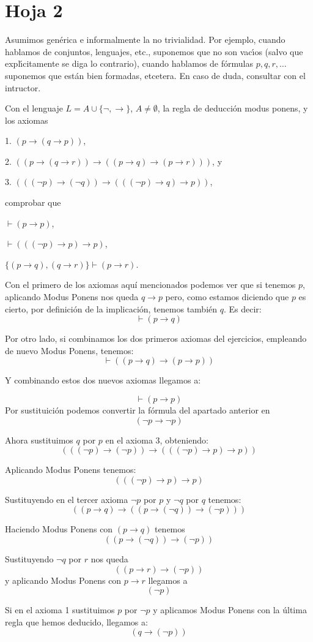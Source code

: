 \section{Hoja 2}

Asumimos gen\'erica e informalmente la no trivialidad. Por ejemplo,
cuando hablamos de conjuntos, lenguajes, etc., suponemos que no  son vac\'{\i}os (salvo que
expl\'{\i}citamente
se diga lo contrario),  cuando hablamos de f\'ormulas $p, q, r, \dots$
suponemos que est\'an bien formadas, etcetera.
En caso de duda, consultar con el intructor.

\begin{problem}[1]
Con el lenguaje $L = A \cup \{\neg, \to\}$, $A \ne \emptyset$, la regla de deducci\'on modus ponens,
y los axiomas

1.  $ (p\to (q\to p))$,

2. $( (p\to (q\to r)) \to  ( (p\to q) \to (p\to r)))$, y

3. $(( (\neg p) \to (\neg q)) \to  ( ((\neg p) \to q) \to p))$,

comprobar que

\ppart $\vdash (p\to p)$,

\ppart $\vdash ((( \neg p) \to p)\to p)$,

\ppart  $\{(p\to q), (q\to r)\} \vdash (p\to r)$.
\solution

\spart
Con el primero de los axiomas aquí mencionados podemos ver que si tenemos $p$, aplicando Modus Ponens nos queda $q \to p$ pero, como estamos diciendo que $p$ es cierto, por definición de la implicación, tenemos también $q$. Es decir:
\[\vdash (p \to q)\]

Por otro lado, si combinamos los dos primeros axiomas del ejercicios, empleando de nuevo Modus Ponens, tenemos:
\[\vdash ( (p\to q) \to (p\to p))\]

Y combinando estos dos nuevos axiomas llegamos a:

\[\vdash (p \to p)\]
\spart
Por sustituición podemos convertir la fórmula del apartado anterior en
\[ (\neg p \to \neg p)\]

Ahora sustituimos $q$ por $p$ en el axioma 3, obteniendo:
\[ (( (\neg p) \to (\neg p)) \to  ( ((\neg p) \to p) \to p))\]

Aplicando Modus Ponens tenemos:
\[ ( ((\neg p) \to p) \to p)\]

\spart

Sustituyendo en el tercer axioma $\neg p$ por $p$ y $\neg q $ por $q$ tenemos:
\[(( p \to q ) \to ((p \to (\neg q)) \to (\neg p)))\]

Haciendo Modus Ponens con $(p \to q)$ tenemos
\[((p \to (\neg q)) \to (\neg p))\]

Sustituyendo $\neg q$ por $r$ nos queda
\[((p \to r) \to (\neg p))\]
y aplicando Modus Ponens con $p \to r$ llegamos a
\[(\neg p)\]

Si en el axioma 1 sustituimos $p$ por $\neg p$ y aplicamos Modus Ponens con la última regla que hemos deducido, llegamos a:
\[(q \to (\neg p))\]
\end{problem}


